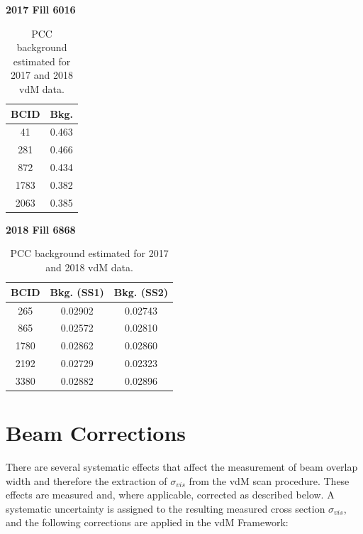\begin{table}[h]
    \caption{PCC background estimated for 2017 and 2018 vdM data.}
    \label{tab:vdm_bkg}
    \centering
    \begin{minipage}{0.45\textwidth}
        \centering
        \textbf{2017 Fill 6016} \\ 
        \begin{tabular}{cc}
            BCID & Bkg. \\ \hline
            41   & 0.463 \\
            281  & 0.466 \\
            872  & 0.434 \\
            1783 & 0.382 \\
            2063 & 0.385 \\
        \end{tabular}
    \end{minipage}
     \hspace{1mm}
    \begin{minipage}{0.45\textwidth}
        \centering
        \textbf{2018 Fill 6868} \\ 
        \begin{tabular}{ccc}
            BCID  & Bkg. (SS1) & Bkg. (SS2) \\ \hline
            265   & 0.02902    & 0.02743    \\
            865   & 0.02572    & 0.02810    \\
            1780  & 0.02862    & 0.02860    \\
            2192  & 0.02729    & 0.02323    \\
            3380  & 0.02882    & 0.02896    \\
        \end{tabular}
    \end{minipage}
\end{table}







\section{Beam Corrections}
\label{bbcorrections}

There are several systematic effects that affect the measurement of beam overlap width and therefore the extraction of $\sigma_{vis}$ from the vdM scan procedure. These effects are measured and, where applicable, corrected as described below. A systematic uncertainty is assigned to the resulting measured cross section $\sigma_{vis}$, and the following corrections are applied in the vdM Framework:
 
